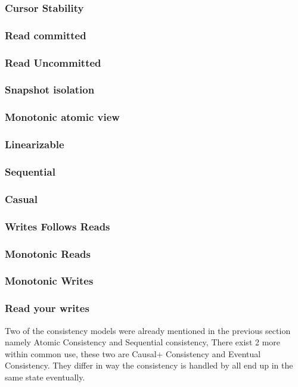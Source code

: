 \documentclass[a4paper,10pt,titlepage]{report}
\begin{document}
\subsubsection{Cursor Stability}

\subsubsection{Read committed}

\subsubsection{Read Uncommitted}

\subsubsection{Snapshot isolation}

\subsubsection{Monotonic atomic view}

\subsubsection{Linearizable}
\subsubsection{Sequential}
\subsubsection{Casual}
\subsubsection{Writes Follows Reads}
\subsubsection{Monotonic Reads}
\subsubsection{Monotonic Writes}
\subsubsection{Read your writes}

Two of the consistency models were already mentioned in the previous section namely Atomic Consistency and Sequential consistency, There exist 2 more within common use, these two are Causal+ Consistency and  Eventual Consistency. They differ in way the consistency is handled by all end up in the same state eventually.
\end{document}
